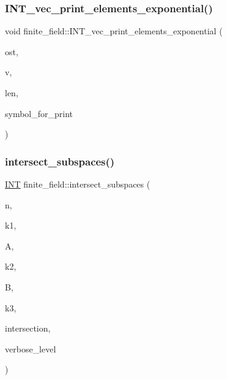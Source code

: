 \subsubsection{\texorpdfstring{I\+N\+T\+\_\+vec\+\_\+print\+\_\+elements\+\_\+exponential()}{INT\_vec\_print\_elements\_exponential()}}
{\footnotesize\ttfamily void finite\+\_\+field\+::\+I\+N\+T\+\_\+vec\+\_\+print\+\_\+elements\+\_\+exponential (\begin{DoxyParamCaption}\item[{ostream \&}]{ost,  }\item[{\mbox{\hyperlink{galois_8h_a09fddde158a3a20bd2dcadb609de11dc}{I\+NT}} $\ast$}]{v,  }\item[{\mbox{\hyperlink{galois_8h_a09fddde158a3a20bd2dcadb609de11dc}{I\+NT}}}]{len,  }\item[{const \mbox{\hyperlink{galois_8h_ab6cc7b4aeb6ea31aba2b3fbfc83ff5e6}{B\+Y\+TE}} $\ast$}]{symbol\+\_\+for\+\_\+print }\end{DoxyParamCaption})}

\mbox{\label{classfinite__field_af887ed38de1b121a4260e828d069aa3e}} 
\subsubsection{\texorpdfstring{intersect\+\_\+subspaces()}{intersect\_subspaces()}}
{\footnotesize\ttfamily \mbox{\hyperlink{galois_8h_a09fddde158a3a20bd2dcadb609de11dc}{I\+NT}} finite\+\_\+field\+::intersect\+\_\+subspaces (\begin{DoxyParamCaption}\item[{\mbox{\hyperlink{galois_8h_a09fddde158a3a20bd2dcadb609de11dc}{I\+NT}}}]{n,  }\item[{\mbox{\hyperlink{galois_8h_a09fddde158a3a20bd2dcadb609de11dc}{I\+NT}}}]{k1,  }\item[{\mbox{\hyperlink{galois_8h_a09fddde158a3a20bd2dcadb609de11dc}{I\+NT}} $\ast$}]{A,  }\item[{\mbox{\hyperlink{galois_8h_a09fddde158a3a20bd2dcadb609de11dc}{I\+NT}}}]{k2,  }\item[{\mbox{\hyperlink{galois_8h_a09fddde158a3a20bd2dcadb609de11dc}{I\+NT}} $\ast$}]{B,  }\item[{\mbox{\hyperlink{galois_8h_a09fddde158a3a20bd2dcadb609de11dc}{I\+NT}} \&}]{k3,  }\item[{\mbox{\hyperlink{galois_8h_a09fddde158a3a20bd2dcadb609de11dc}{I\+NT}} $\ast$}]{intersection,  }\item[{\mbox{\hyperlink{galois_8h_a09fddde158a3a20bd2dcadb609de11dc}{I\+NT}}}]{verbose\+\_\+level }\end{DoxyParamCaption})}

